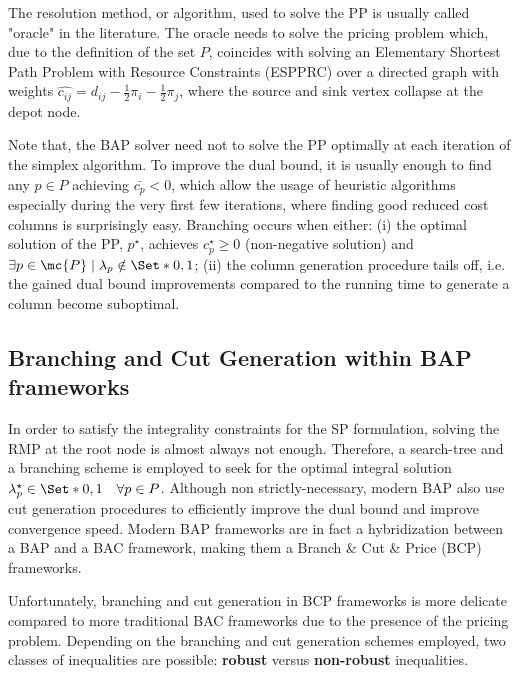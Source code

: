 The resolution method, or algorithm, used to solve the PP is usually called "oracle" in the literature.
The oracle needs to solve the pricing problem which, due to the definition of the set $P$, coincides with solving an Elementary Shortest Path Problem with Resource Constraints (ESPPRC) over a directed graph with weights $\hat{c_{ij}} = d_{ij} - \frac{1}{2} \pi_i - \frac{1}{2} \pi_j$, where the source and sink vertex collapse at the depot node.

Note that, the BAP solver need not to solve the PP optimally at each iteration of the simplex algorithm.
To improve the dual bound, it is usually enough to find any $p \in P$ achieving $\bar{c_p} < 0$, which allow the usage of heuristic algorithms especially during the very first few iterations, where finding good reduced cost columns is surprisingly easy.
Branching occurs when either: (i) the optimal solution of the PP, $p^\star$, achieves $c^\star_p \ge 0$ (non-negative solution) and $\exists p \in \mc{P} \mid \lambda_p \notin \Set*{0, 1}$; (ii) the column generation procedure tails off, i.e. the gained dual bound improvements compared to the running time to generate a column become suboptimal.



\subsection{Branching and Cut Generation within BAP frameworks}
\label{sec:intro-branching-and-cut-generation-within-bap-frameworks}

In order to satisfy the integrality constraints for the SP formulation, solving the RMP at the root node
is almost always not enough.
Therefore, a search-tree and a branching scheme is employed to seek for the optimal integral solution $\lambda^\star_p \in \Set*{0, 1} \quad \forall p \in P$.
Although non strictly-necessary, modern BAP also use cut generation procedures to efficiently improve the dual bound and improve convergence speed.
Modern BAP frameworks are in fact a hybridization between a BAP and a BAC framework, making them a Branch \& Cut \& Price (BCP) frameworks.

\medskip

Unfortunately, branching and cut generation in BCP frameworks is more delicate compared to more traditional BAC frameworks due to the presence of the pricing problem.
Depending on the branching and cut generation schemes employed, two classes of inequalities are possible: \textbf{robust} versus \textbf{non-robust} inequalities.

